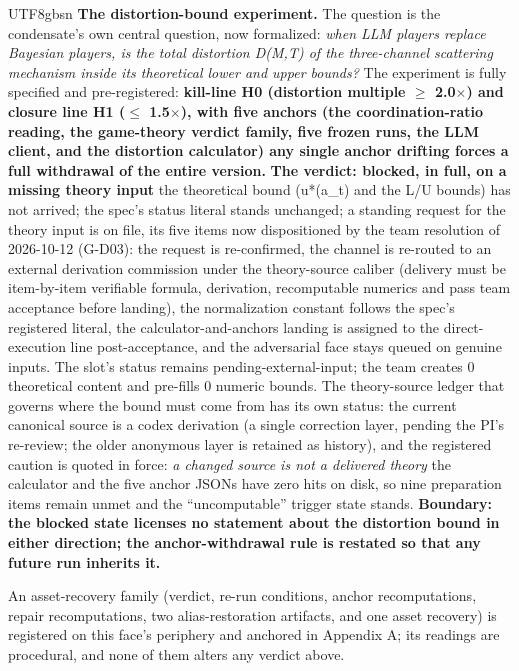\documentclass[11pt,letterpaper]{article}
\begin{document}
\begin{CJK}{UTF8}{gbsn}
\textbf{The distortion-bound experiment.} The question is the condensate's own central question, now formalized: \emph{when LLM players replace Bayesian players, is the total distortion D(M,T) of the three-channel scattering mechanism inside its theoretical lower and upper bounds?} The experiment is fully specified and pre-registered: \textbf{kill-line H0 (distortion multiple \ensuremath{\geq} 2.0\ensuremath{\times}) and closure line H1 (\ensuremath{\leq} 1.5\ensuremath{\times}), with five anchors (the coordination-ratio reading, the game-theory verdict family, five frozen runs, the LLM client, and the distortion calculator) \textemdash{} any single anchor drifting forces a full withdrawal of the entire version.} \textbf{The verdict: blocked, in full, on a missing theory input} \textemdash{} the theoretical bound (u*(a\_t) and the L/U bounds) has not arrived; the spec's status literal stands unchanged; a standing request for the theory input is on file, its five items now dispositioned by the team resolution of 2026-10-12 (G-D03): the request is re-confirmed, the channel is re-routed to an external derivation commission under the theory-source caliber (delivery must be item-by-item verifiable \textemdash{} formula, derivation, recomputable numerics \textemdash{} and pass team acceptance before landing), the normalization constant follows the spec's registered literal, the calculator-and-anchors landing is assigned to the direct-execution line post-acceptance, and the adversarial face stays queued on genuine inputs. The slot's status remains pending-external-input; the team creates 0 theoretical content and pre-fills 0 numeric bounds. The theory-source ledger that governs where the bound must come from has its own status: the current canonical source is a codex derivation (a single correction layer, pending the PI's re-review; the older anonymous layer is retained as history), and the registered caution is quoted in force: \emph{a changed source is not a delivered theory} \textemdash{} the calculator and the five anchor JSONs have zero hits on disk, so nine preparation items remain unmet and the ``uncomputable'' trigger state stands. \textbf{Boundary: the blocked state licenses no statement about the distortion bound in either direction; the anchor-withdrawal rule is restated so that any future run inherits it.}

An asset-recovery family (verdict, re-run conditions, anchor recomputations, repair recomputations, two alias-restoration artifacts, and one asset recovery) is registered on this face's periphery and anchored in Appendix A; its readings are procedural, and none of them alters any verdict above.


\end{CJK}
\end{document}
